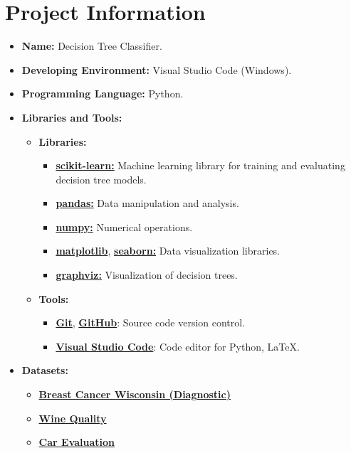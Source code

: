 \section{Project Information}
\begin{itemize}
  \item \textbf{Name:} Decision Tree Classifier.
  \item \textbf{Developing Environment:} Visual Studio Code (Windows).
  \item \textbf{Programming Language:} Python.
  \item \textbf{Libraries and Tools:}
        \begin{itemize}
          \item \textbf{Libraries:}
                \begin{itemize}
                  \item \href{https://scikit-learn.org/stable/}{\textbf{scikit-learn:}} Machine learning library for training and evaluating decision tree models.
                  \item \href{https://pandas.pydata.org/}{\textbf{pandas:}} Data manipulation and analysis.
                  \item \href{https://numpy.org/}{\textbf{numpy:}} Numerical operations.
                  \item \href{https://matplotlib.org/}{\textbf{matplotlib}}, \href{https://seaborn.pydata.org/}{\textbf{seaborn:}} Data visualization libraries.
                  \item \href{https://graphviz.org/}{\textbf{graphviz:}} Visualization of decision trees.
                \end{itemize}
          \item \textbf{Tools:}
                \begin{itemize}
                  \item \href{https://git-scm.com/}{\textbf{Git}}, \href{https://github.com/}{\textbf{GitHub}}: Source code version control.
                  \item \href{https://code.visualstudio.com/}{\textbf{Visual Studio Code}}: Code editor for Python, LaTeX.
                \end{itemize}
        \end{itemize}
  \item \textbf{Datasets:}
        \begin{itemize}
          \item \href{https://archive.ics.uci.edu/dataset/17/breast+cancer+wisconsin+diagnostic}{\textbf{Breast Cancer Wisconsin (Diagnostic)}}
          \item \href{https://archive.ics.uci.edu/dataset/186/wine+quality}{\textbf{Wine Quality}}
          \item \href{https://archive.ics.uci.edu/dataset/19/car+evaluation}{\textbf{Car Evaluation}}
        \end{itemize}
\end{itemize}

